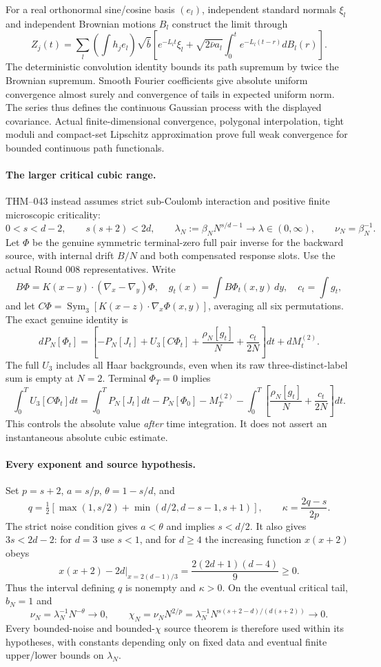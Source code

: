 \documentclass[10pt]{article}
\begin{document}
For a real orthonormal sine/cosine basis $(e_l)$, independent standard normals $\xi_l$ and independent Brownian motions $B_l$ construct the limit through
\[
 Z_j(t)=\sum_l\left(\int h_je_l\right)\sqrt{\bar b}
 \left[e^{-L_lt}\xi_l+\sqrt{2\bar\nu a_l}\int_0^t e^{-L_l(t-r)}dB_l(r)\right].
\]
The deterministic convolution identity bounds its path supremum by twice the Brownian supremum. Smooth Fourier coefficients give absolute uniform convergence almost surely and convergence of tails in expected uniform norm. The series thus defines the continuous Gaussian process with the displayed covariance. Actual finite-dimensional convergence, polygonal interpolation, tight moduli and compact-set Lipschitz approximation prove full weak convergence for bounded continuous path functionals.

\paragraph{The larger critical cubic range.}
THM--043 instead assumes strict sub-Coulomb interaction and positive finite microscopic criticality:
\[
 0<s<d-2,\qquad s(s+2)<2d,\qquad
 \lambda_N:=\beta_NN^{s/d-1}\longrightarrow\lambda\in(0,\infty),
 \qquad\nu_N=\beta_N^{-1}.
\]
Let $\Phi$ be the genuine symmetric terminal-zero full pair inverse for the backward source, with internal drift $B/N$ and both compensated response slots. Use the actual Round 008 representatives. Write
\[
 B\Phi=K(x-y)\cdot(\nabla_x-\nabla_y)\Phi,\quad
 g_t(x)=\int B\Phi_t(x,y)\,dy,\quad c_t=\int g_t,
\]
and let $C\Phi=\operatorname{Sym}_3[K(x-z)\cdot\nabla_x\Phi(x,y)]$, averaging all six permutations. The exact genuine identity is
\[
 dP_N[\Phi_t]=\left[-P_N[J_t]+U_3[C\Phi_t]
          +\frac{\rho_N[g_t]}N+\frac{c_t}{2N}\right]dt+dM_t^{(2)}.
\]
The full $U_3$ includes all Haar backgrounds, even when its raw three-distinct-label sum is empty at $N=2$. Terminal $\Phi_T=0$ implies
\[
 \int_0^TU_3[C\Phi_t]dt
 =\int_0^TP_N[J_t]dt-P_N[\Phi_0]-M_T^{(2)}
       -\int_0^T\left[\frac{\rho_N[g_t]}N+\frac{c_t}{2N}\right]dt.
\]
This controls the absolute value \emph{after} time integration. It does not assert an instantaneous absolute cubic estimate.

\paragraph{Every exponent and source hypothesis.}
Set $p=s+2$, $a=s/p$, $\theta=1-s/d$, and
\[
 q=\tfrac12\left[\max(1,s/2)+\min(d/2,d-s-1,s+1)\right],\qquad
 \kappa=\frac{2q-s}{2p}.
\]
The strict noise condition gives $a<\theta$ and implies $s<d/2$. It also gives $3s<2d-2$: for $d=3$ use $s<1$, and for $d\ge4$ the increasing function $x(x+2)$ obeys
\[
 \left. x(x+2)-2d\right|_{x=2(d-1)/3}
 =\frac{2(2d+1)(d-4)}9\ge0.
\]
Thus the interval defining $q$ is nonempty and $\kappa>0$. On the eventual critical tail, $b_N=1$ and
\[
 \nu_N=\lambda_N^{-1}N^{-\theta}\to0,\qquad
 \chi_N=\nu_NN^{2/p}
 =\lambda_N^{-1}N^{s(s+2-d)/(d(s+2))}\to0.
\]
Every bounded-noise and bounded-$\chi$ source theorem is therefore used within its hypotheses, with constants depending only on fixed data and eventual finite upper/lower bounds on $\lambda_N$.
\end{document}
